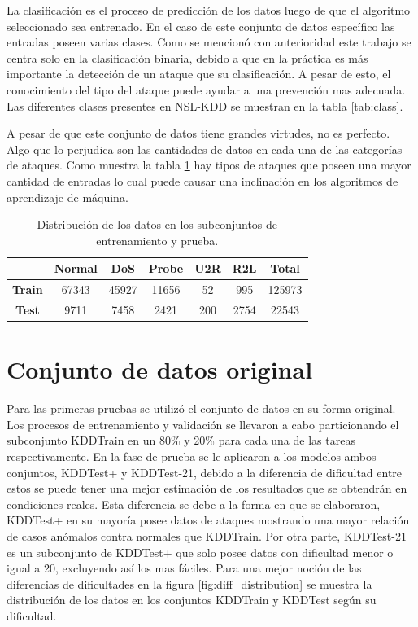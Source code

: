 La clasificación es el proceso de predicción de los datos luego de que el algoritmo seleccionado sea entrenado. En el caso de este conjunto de datos específico las entradas poseen varias clases. Como se mencionó con anterioridad este trabajo se centra solo en la clasificación binaria, debido a que en la práctica es más importante la detección de un ataque que su clasificación. A pesar de esto, el conocimiento del tipo del ataque puede ayudar a una prevención mas adecuada. Las diferentes clases presentes en NSL-KDD se muestran en la tabla \ref{tab:class}.

A pesar de que este conjunto de datos tiene grandes virtudes, no es perfecto. Algo que lo perjudica son las cantidades de datos en cada una de las categorías de ataques. Como muestra la tabla \ref{tab:atk_counts} hay tipos de ataques que poseen una mayor cantidad de entradas lo cual puede causar una inclinación en los algoritmos de aprendizaje de máquina.

\begin{table}[h]
    \begin{center}
        \caption{Distribución de los datos en los subconjuntos de entrenamiento y prueba.}
        
        \label{tab:atk_counts}
        \begin{tabular}{c|c|c|c|c|c|c} %
        \textbf{} & \textbf{Normal} & \textbf{DoS} & \textbf{Probe} & \textbf{U2R} & \textbf{R2L} & \textbf{Total}\\
        \hline
        \textbf{Train} & 67343 & 45927 & 11656 & 52 & 995 & 125973\\
        \textbf{Test} & 9711 & 7458 & 2421 & 200 & 2754 & 22543\\
        \end{tabular}
    \end{center}
\end{table}

\section{Conjunto de datos original}
Para las primeras pruebas se utilizó el conjunto de datos en su forma original. Los procesos de entrenamiento y validación se llevaron a cabo particionando el subconjunto KDDTrain en un 80\% y 20\% para cada una de las tareas respectivamente. En la fase de prueba se le aplicaron a los modelos ambos conjuntos, KDDTest+ y KDDTest-21, debido a la diferencia de dificultad entre estos se puede tener una mejor estimación de los resultados que se obtendrán en condiciones reales. Esta diferencia se debe a la forma en que se elaboraron, KDDTest+ en su mayoría posee datos de ataques mostrando una mayor relación de casos anómalos contra normales que KDDTrain. Por otra parte, KDDTest-21 es un subconjunto de KDDTest+ que solo posee datos con dificultad menor o igual a 20, excluyendo así los mas fáciles. Para una mejor noción de las diferencias de dificultades en la figura \ref{fig:diff_distribution} se muestra la distribución de los datos en los conjuntos KDDTrain y KDDTest según su dificultad.

